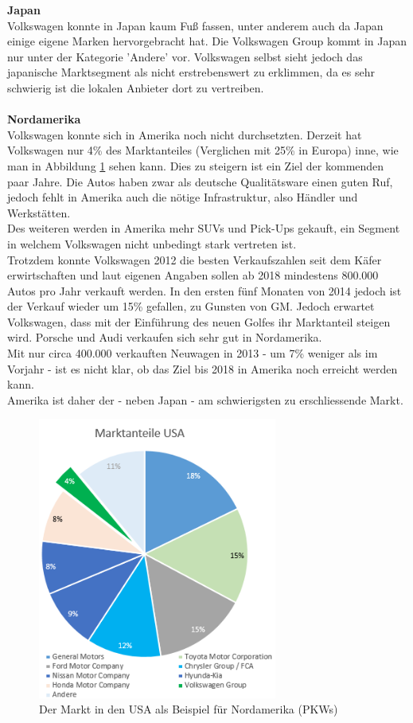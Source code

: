 \documentclass[12pt]{article}
\begin{document}
\noindent
\textbf{Japan} \\
Volkswagen konnte in Japan kaum Fuß fassen, unter anderem auch da Japan einige eigene Marken hervorgebracht hat.  Die Volkswagen Group kommt in Japan nur unter der Kategorie 'Andere' vor. Volkswagen selbst sieht jedoch das japanische Marktsegment als nicht erstrebenswert zu erklimmen, da es sehr schwierig ist die lokalen Anbieter dort zu vertreiben.
\\\\
\textbf{Nordamerika}\\
Volkswagen konnte sich in Amerika noch nicht durchsetzten. Derzeit hat Volkswagen nur 4\% des Marktanteiles (Verglichen mit 25\% in Europa) inne, wie man in Abbildung \ref{fig:marktnordamerika} sehen kann. Dies zu steigern ist ein Ziel der kommenden paar Jahre. Die Autos haben zwar als deutsche Qualitätsware einen guten Ruf, jedoch fehlt in Amerika auch die nötige Infrastruktur, also Händler und Werkstätten. \\ Des weiteren werden in Amerika mehr SUVs und Pick-Ups gekauft, ein Segment in welchem Volkswagen nicht unbedingt stark vertreten ist.\\
Trotzdem konnte Volkswagen 2012 die besten Verkaufszahlen seit dem Käfer erwirtschaften und laut eigenen Angaben sollen ab 2018 mindestens 800.000 Autos pro Jahr verkauft werden. In den ersten fünf Monaten von 2014 jedoch ist der Verkauf wieder um 15\% gefallen, zu Gunsten von GM. Jedoch erwartet Volkswagen, dass mit der Einführung des neuen Golfes ihr Marktanteil steigen wird. Porsche und Audi verkaufen sich sehr gut in Nordamerika. \cite{vwamstrategiechina} \\
Mit nur circa 400.000 verkauften Neuwagen in 2013 - um 7\% weniger als im Vorjahr - ist es nicht klar, ob das Ziel bis 2018 in Amerika noch erreicht werden kann.\cite{ec1}\\
Amerika ist daher der - neben Japan - am schwierigsten zu erschliessende Markt.
\begin{figure}[!h]
\centering
\includegraphics[width=0.7\textwidth]{images/maam}
\caption{Der Markt in den USA als Beispiel für Nordamerika (PKWs)}
\label{fig:marktnordamerika}
\end{figure}\FloatBarrier
\end{document}
